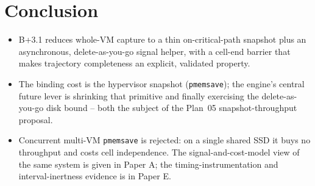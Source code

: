 \documentclass[conference]{IEEEtran}
\begin{document}
\section{Conclusion}
\begin{itemize}
  \item B+3.1 reduces whole-VM capture to a thin on-critical-path snapshot plus
        an asynchronous, delete-as-you-go signal helper, with a cell-end barrier
        that makes trajectory completeness an explicit, validated property.
  \item The binding cost is the hypervisor snapshot (\texttt{pmemsave}); the
        engine's central future lever is shrinking that primitive and finally
        exercising the delete-as-you-go disk bound -- both the subject of the
        Plan~05 snapshot-throughput proposal.
  \item Concurrent multi-VM \texttt{pmemsave} is rejected: on a single shared
        SSD it buys no throughput and costs cell independence. The
        signal-and-cost-model view of the same system is given in Paper A;
        the timing-instrumentation and interval-inertness evidence is in
        Paper E.
\end{itemize}




\end{document}
